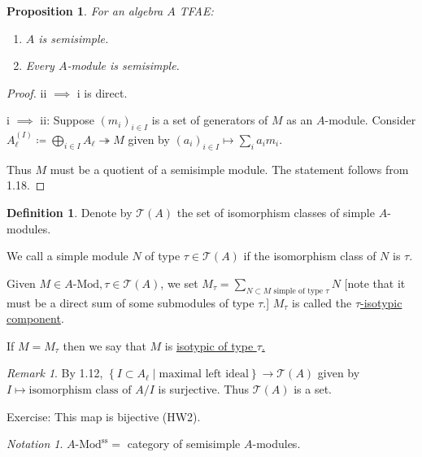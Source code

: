 \documentclass{article}
\theoremstyle{definition}
\newtheorem*{definition}{Definition}
\theoremstyle{plain}
\newtheorem{proposition}[theorem]{Proposition}
\theoremstyle{remark}
\newtheorem*{remark*}{Remark}
\newtheorem*{notation*}{Notation}
\begin{document}
    \begin{proposition}
        For an algebra \(A\) TFAE:

        \begin{enumerate}[label=\roman*)]
            \item \(A\) is semisimple.
            \item Every \(A\)-module is semisimple. 
        \end{enumerate} 
    \end{proposition}

    \begin{proof}
        ii \(\implies\) i is direct.

        i \(\implies\) ii: Suppose \((m_i)_{i\in I}\) is a set of generators of \(M\) as an \(A\)-module. Consider \(A_\ell^{(I)} \coloneqq \bigoplus_{i\in I} A_\ell \twoheadrightarrow M\) given by \((a_i)_{i\in I} \mapsto \sum_{i} a_i m_i\).

        Thus \(M\) must be a quotient of a semisimple module. The statement follows from 1.18.
    \end{proof}

    \begin{definition}
        Denote by \(\mathcal{T}(A)\) the set of isomorphism classes of simple \(A\)-modules.

        We call a simple module \(N\) of type \(\tau \in \mathcal{T}(A)\) if the isomorphism class of \(N\) is \(\tau\).

        Given \(M\in A\text{-Mod}, \tau \in \mathcal{T}(A)\), we set \(M_{\tau} = \sum_{N \subset M \text{ simple of type } \tau} N\) [note that it must be a direct sum of some submodules of type \(\tau\).] \(M_{\tau} \) is called the \underline{\(\tau\)-isotypic component}.

        If \(M = M_{\tau}\) then we say that \(M\) is \underline{isotypic of type \(\tau\).} 
    \end{definition}

    \begin{remark*}
        By 1.12, \(\left\{ I \subset A_\ell \mid \text{maximal left ideal} \right\} \to \mathcal{T}(A)\) given by \(I \mapsto \text{isomorphism class of } A / I\) is surjective. Thus \(\mathcal{T}(A)\) is a set.
        
        Exercise: This map is bijective (HW2).
    \end{remark*}

    \begin{notation*}
        \(A\text{-Mod}^{\text{ss}} =\) category of semisimple \(A\)-modules.
    \end{notation*}
\end{document}
